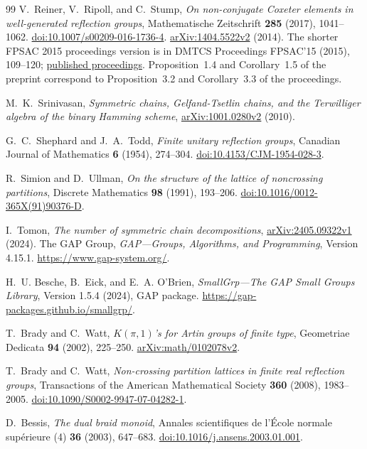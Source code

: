 \documentclass[11pt]{article}
\theoremstyle{definition}
\begin{document}
\begin{thebibliography}{99}
V.~Reiner, V.~Ripoll, and C.~Stump, \emph{On non-conjugate Coxeter
elements in well-generated reflection groups}, Mathematische
Zeitschrift \textbf{285} (2017), 1041--1062.
\href{https://doi.org/10.1007/s00209-016-1736-4}{doi:10.1007/s00209-016-1736-4}.
\href{https://arxiv.org/abs/1404.5522v2}{arXiv:1404.5522v2} (2014).
The shorter FPSAC 2015 proceedings version is in DMTCS Proceedings
FPSAC'15 (2015), 109--120;
\href{https://dmtcs.episciences.org/2466/pdf}{published proceedings}.
Proposition~1.4 and Corollary~1.5 of the preprint correspond to
Proposition~3.2 and Corollary~3.3 of the proceedings.

M.~K.~Srinivasan, \emph{Symmetric chains, Gelfand-Tsetlin chains,
and the Terwilliger algebra of the binary Hamming scheme},
\href{https://arxiv.org/abs/1001.0280v2}{arXiv:1001.0280v2} (2010).

G.~C.~Shephard and J.~A.~Todd, \emph{Finite unitary reflection groups},
Canadian Journal of Mathematics \textbf{6} (1954), 274--304.
\href{https://doi.org/10.4153/CJM-1954-028-3}{doi:10.4153/CJM-1954-028-3}.

R.~Simion and D.~Ullman, \emph{On the structure of the lattice of
noncrossing partitions}, Discrete Mathematics \textbf{98} (1991),
193--206.
\href{https://doi.org/10.1016/0012-365X(91)90376-D}{doi:10.1016/0012-365X(91)90376-D}.

I.~Tomon, \emph{The number of symmetric chain decompositions},
\href{https://arxiv.org/abs/2405.09322v1}{arXiv:2405.09322v1} (2024).
The GAP Group, \emph{GAP---Groups, Algorithms, and Programming},
Version 4.15.1. \url{https://www.gap-system.org/}.

H.~U. Besche, B.~Eick, and E.~A. O'Brien,
\emph{SmallGrp---The GAP Small Groups Library},
Version 1.5.4 (2024), GAP package.
\url{https://gap-packages.github.io/smallgrp/}.

T.~Brady and C.~Watt, \emph{$K(\pi,1)$'s for Artin groups of finite type},
Geometriae Dedicata \textbf{94} (2002), 225--250.
\href{https://arxiv.org/abs/math/0102078v2}{arXiv:math/0102078v2}.

T.~Brady and C.~Watt, \emph{Non-crossing partition lattices in finite real
reflection groups}, Transactions of the American Mathematical Society
\textbf{360} (2008), 1983--2005.
\href{https://doi.org/10.1090/S0002-9947-07-04282-1}{doi:10.1090/S0002-9947-07-04282-1}.

D.~Bessis, \emph{The dual braid monoid},
Annales scientifiques de l'\'Ecole normale sup\'erieure (4)
\textbf{36} (2003), 647--683.
\href{https://doi.org/10.1016/j.ansens.2003.01.001}{doi:10.1016/j.ansens.2003.01.001}.


\end{thebibliography}
\end{document}
